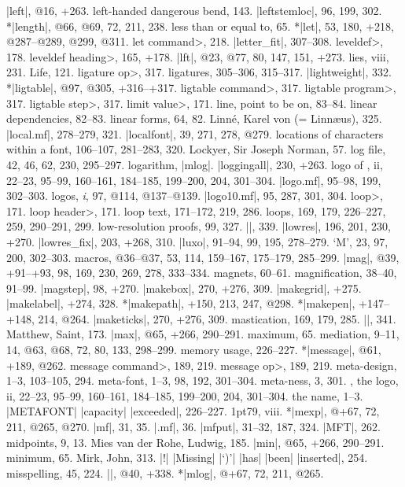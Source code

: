 |left|, @16, +263.
left-handed dangerous bend, 143.
|leftstemloc|, 96, 199, 302.
*|length|, @66, @69, 72, 211, 238.
less than or equal to, 65.
*|let|, 53, 180, +218, @287--@289, @299, @311.
\<let command>, 218.
|letter_fit|, 307--308.
\<leveldef>, 178.
\<leveldef heading>, 165, +178.
|lft|, @23, @77, 80, 147, 151, +273.
lies, viii, 231.
Life, 121.
\<ligature op>, 317.
ligatures, 305--306, 315--317.
|lightweight|, 332.
*|ligtable|, @97, @305, +316--+317.
\<ligtable command>, 317.
\<ligtable program>, 317.
\<ligtable step>, 317.
\<limit value>, 171.
line, point to be on, 83--84.
linear dependencies, 82--83.
linear forms, 64, 82.
Linn\'e, Karel von (= Linn\ae us), 325.
|local.mf|, 278--279, 321.
|localfont|, 39, 271, 278, @279.
locations of characters within a font, 106--107, 281--283, 320.
Lockyer, Sir Joseph Norman, 57.
log file, 42, 46, 62, 230, 295--297.
logarithm, \see |mlog|.
|loggingall|, 230, +263.
logo of \MF, ii, 22--23, 95--99, 160--161, 184--185, 199--200, 204, 301--304.
|logo.mf|, 95--98, 199, 302--303.
logos, {\it i},  97, @114, @137--@139.
|logo10.mf|, 95, 287, 301, 304.
\<loop>, 171.
\<loop header>, 171.
loop text, 171--172, 219, 286.
loops, 169, 179, 226--227, 259, 290--291, 299.
low-resolution proofs, 99, 327.
|\lowers|, 339.
|lowres|, 196, 201, 230, +270.
|lowres_fix|, 203, +268, 310.
|luxo|, 91--94, 99, 195, 278--279.
\newletter
`M', 23, 97, 200, 302--303.
macros, @36--@37, 53, 114, 159--167, 175--179, 285--299.
|mag|, @39, +91--+93, 98, 169, 230, 269, 278, 333--334.
magnets, 60--61.
magnification, 38--40, 91--99.
|magstep|, 98, +270.
|makebox|, 270, +276, 309.
|makegrid|, +275.
|makelabel|, +274, 328.
*|makepath|, +150, 213, 247, @298.
*|makepen|, +147--+148, 214, @264.
|maketicks|, 270, +276, 309.
mastication, 169, 179, 285.
|\math|, 341.
Matthew, Saint, 173.
|max|, @65, +266, 290--291.
maximum, 65.
mediation, 9--11, 14, @63, @68, 72, 80, 133, 298--299.
memory usage, 226--227.
*|message|, @61, +189, @262.
\<message command>, 189, 219.
\<message op>, 189, 219.
meta-design, 1--3, 103--105, 294.
meta-font, 1--3, 98, 192, 301--304.
meta-ness, 3, 301.
\MF, the logo, ii, 22--23, 95--99, 160--161, 184--185, 199--200,
 204, 301--304.
\sub the name, 1--3.
|METAFONT| |capacity| |exceeded|, 226--227.
\MF\kern1pt79, viii.
*|mexp|, @+67, 72, 211, @265, @270.
|mf|, 31, 35.
|.mf|, 36.
|mfput|, 31--32, 187, 324.
|MFT|, 262.
midpoints, 9, 13.
Mies van der Rohe, Ludwig, 185.
|min|, @65, +266, 290--291.
minimum, 65.
Mirk, John, 313.
|!| |Missing| |`)'| |has| |been| |inserted|, 254.
misspelling, 45, 224.
|\mixture|, @40, +338.
*|mlog|, @+67, 72, 211, @265.
